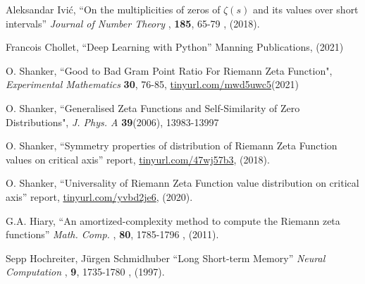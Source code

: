 \documentclass[twoside]{article}
\begin{document}
\begin{thebibliography}{10}
 Aleksandar Ivić, 
``On the multiplicities of zeros of $\zeta(s)$ and its values over short intervals''
{\it  Journal of Number Theory }, {\bf 185}, 65-79 , (2018). 

 Francois Chollet, ``Deep Learning with Python''
Manning Publications,  (2021)

 O. Shanker, 
``Good to Bad Gram Point Ratio For Riemann Zeta Function",
{\it Experimental Mathematics} {\bf 30}, 76-85,
\url{tinyurl.com/mwd5uwc5}(2021)

 O. Shanker, 
``Generalised Zeta Functions and Self-Similarity of Zero Distributions",
{\it J.  Phys. A} {\bf39}(2006), 13983-13997

 O. Shanker, 
``Symmetry properties of distribution of Riemann Zeta Function values on critical axis''
 report,
\url{tinyurl.com/47wj57b3}, 
(2018). 

 O. Shanker, 
``Universality of Riemann Zeta Function value distribution on critical axis''
 report,
\url{tinyurl.com/yvbd2je6}, 
(2020). 

 G.A. Hiary, 
``An amortized-complexity method to compute the Riemann zeta functions''
{\it  Math. Comp. }, {\bf 80},  1785-1796 , (2011). 

 Sepp Hochreiter,  Jürgen Schmidhuber 
``Long Short-term Memory''
{\it  Neural Computation }, {\bf 9},  1735-1780 , (1997). 



\end{thebibliography} 
\end{document}
